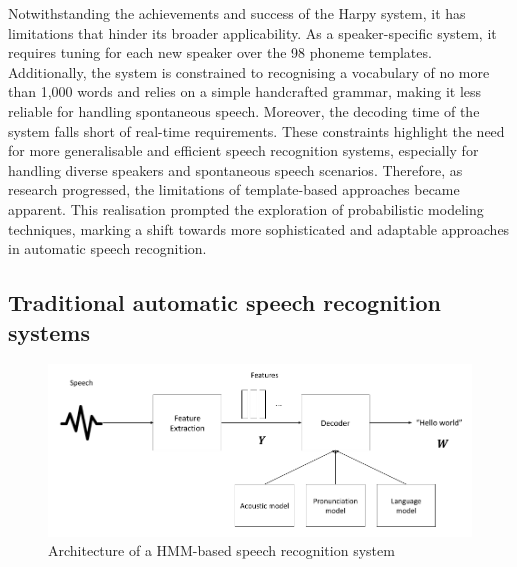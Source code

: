 Notwithstanding the achievements and success of the Harpy system, it has limitations that hinder its broader applicability. As a speaker-specific system, it requires tuning for each new speaker over the 98 phoneme templates. Additionally, the system is constrained to recognising a vocabulary of no more than 1,000 words and relies on a simple handcrafted grammar, making it less reliable for handling spontaneous speech. Moreover, the decoding time of the system falls short of real-time requirements. These constraints highlight the need for more generalisable and efficient speech recognition systems, especially for handling diverse speakers and spontaneous speech scenarios. Therefore, as research progressed, the limitations of template-based approaches became apparent. This realisation prompted the exploration of probabilistic modeling techniques, marking a shift towards more sophisticated and adaptable approaches in automatic speech recognition. 


\subsection{Traditional automatic speech recognition systems} %
\begin{figure}
\includegraphics[width=\textwidth]{imgs/HMM-GMM_architecture.png}
\caption{Architecture of a HMM-based speech recognition system}
\label{HMM-GMM-model}
\end{figure}

